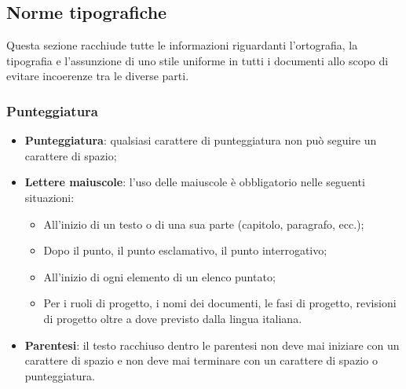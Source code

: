 \newpage
\subsection{Norme tipografiche}
Questa sezione racchiude tutte le informazioni riguardanti l'ortografia, la tipografia e l'assunzione di uno stile uniforme in tutti i documenti allo scopo di evitare incoerenze tra le diverse parti.

\subsubsection{Punteggiatura}
\begin{itemize}
	\item \textbf{Punteggiatura}: qualsiasi carattere di punteggiatura non può seguire un carattere di spazio;
	\item \textbf{Lettere maiuscole}: l'uso delle maiuscole è obbligatorio nelle seguenti situazioni:
	\begin{itemize}
		\item All'inizio di un  testo o di una sua parte (capitolo, paragrafo, ecc.);
		\item Dopo il punto, il punto esclamativo, il punto interrogativo;
		\item All'inizio di ogni elemento di un elenco puntato;
		\item Per i ruoli di progetto, i nomi dei documenti, le fasi di progetto, revisioni di progetto oltre a dove previsto dalla lingua italiana.
	\end{itemize}
	\item \textbf{Parentesi}: il testo racchiuso dentro le parentesi non deve mai iniziare con un carattere di spazio e non deve mai terminare con un carattere di spazio o punteggiatura.
\end{itemize}	

